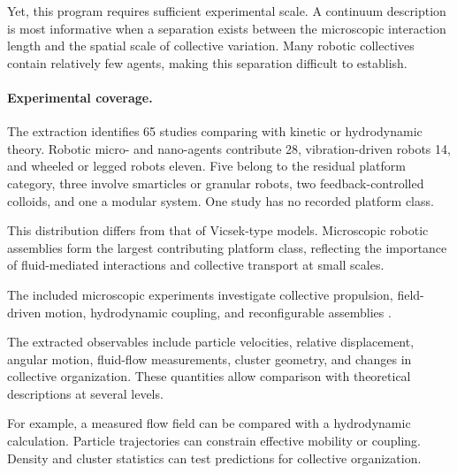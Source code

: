 Yet, this program requires sufficient
experimental scale. A continuum description
is most informative when a separation exists
between the microscopic interaction length
and the spatial scale of collective variation.
Many robotic collectives contain relatively
few agents, making this separation difficult
to establish.

\paragraph*{Experimental coverage.}

The extraction identifies 65 studies comparing
with kinetic or hydrodynamic theory.
Robotic micro- and nano-agents contribute 28,
vibration-driven robots 14,
and wheeled or legged robots eleven.
Five belong to the residual platform category,
three involve smarticles or granular robots,
two feedback-controlled colloids,
and one a modular system.
One study has no recorded platform class.

This distribution differs from that of
Vicsek-type models. Microscopic robotic
assemblies form the largest contributing
platform class, reflecting the importance
of fluid-mediated interactions and
collective transport at small scales.

The included microscopic experiments
investigate collective propulsion,
field-driven motion, hydrodynamic coupling,
and reconfigurable assemblies
\cite{Sun2021swarmingmicrodrople,Calabr2026interactiondrivena,Xie2020bioinspiredsoftmic,Pauer2021programmabledesign,Yigit2019programmablecollect,Das2023optoelectronictraje,McGovern2024multifunctionalchir,Sun2024multiplemagnetoopt,Liu2022bionicmorphological,Xu2023multiplecilialike,Yue2022wheellikemagnetic,Wang2018collectivebehavior,Chen2022programmablespatio,Xu2022collectivebehaviors,Baker2019shapeprogrammed3d,Goyal2025externallycontrolle,Aubret2018targetedassemblyan,Ahmed2021bioinspiredacousto,Yan2024programmingstructur,Yigit2020cohesiveselforgani,Hanson2025electrokineticpropu,Xu2023bioinspiredciliali,Ji2021ondemandassemblya,Xie2019programmablegenerat,Law2024navigationofmagnet,Yu2022adaptivepatternand,Ceron2026fluidictorqueenabl,Li2022vectorcontrolledwh}.

The extracted observables include particle
velocities, relative displacement,
angular motion, fluid-flow measurements,
cluster geometry, and changes in
collective organization. These quantities
allow comparison with theoretical descriptions
at several levels.

For example, a measured flow field can
be compared with a hydrodynamic calculation.
Particle trajectories can constrain
effective mobility or coupling.
Density and cluster statistics can
test predictions for collective
organization.

